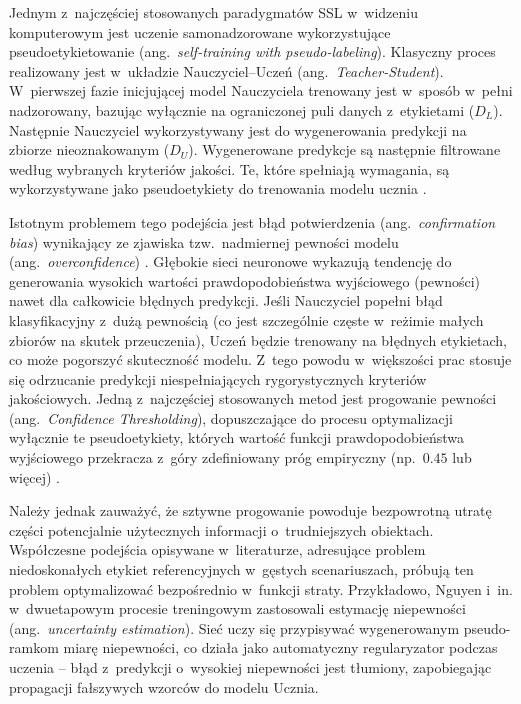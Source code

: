 Jednym z~najczęściej stosowanych paradygmatów SSL w~widzeniu komputerowym jest uczenie samonadzorowane wykorzystujące pseudoetykietowanie (ang.\ \emph{self-training with pseudo-labeling}). Klasyczny proces realizowany jest w~układzie Nauczyciel--Uczeń (ang.\ \emph{Teacher-Student}). W~pierwszej fazie inicjującej model Nauczyciela trenowany jest w~sposób w~pełni nadzorowany, bazując wyłącznie na ograniczonej puli danych z~etykietami ($D_L$). Następnie Nauczyciel wykorzystywany jest do wygenerowania predykcji na zbiorze nieoznakowanym ($D_U$). Wygenerowane predykcje są następnie filtrowane według wybranych kryteriów jakości. Te, które spełniają wymagania, są wykorzystywane jako pseudoetykiety do trenowania modelu ucznia \cite{Lee2013}.

Istotnym problemem tego podejścia jest błąd potwierdzenia (ang.\ \emph{confirmation bias}) wynikający ze zjawiska tzw.\ nadmiernej pewności modelu (ang.\ \emph{overconfidence}) \cite{Guo2017}. Głębokie sieci neuronowe wykazują tendencję do generowania wysokich wartości prawdopodobieństwa wyjściowego (pewności) nawet dla całkowicie błędnych predykcji. Jeśli Nauczyciel popełni błąd klasyfikacyjny z~dużą pewnością (co jest szczególnie częste w~reżimie małych zbiorów na skutek przeuczenia), Uczeń będzie trenowany na błędnych etykietach, co może pogorszyć skuteczność modelu. Z~tego powodu w~większości prac stosuje się odrzucanie predykcji niespełniających rygorystycznych kryteriów jakościowych. Jedną z~najczęściej stosowanych metod jest progowanie pewności (ang.\ \emph{Confidence Thresholding}), dopuszczające do procesu optymalizacji wyłącznie te pseudoetykiety, których wartość funkcji prawdopodobieństwa wyjściowego przekracza z~góry zdefiniowany próg empiryczny (np.\ $0.45$ lub więcej) \cite{Sohn2020}. 

Należy jednak zauważyć, że sztywne progowanie powoduje bezpowrotną utratę części potencjalnie użytecznych informacji o~trudniejszych obiektach. Współczesne podejścia opisywane w~literaturze, adresujące problem niedoskonałych etykiet referencyjnych w~gęstych scenariuszach, próbują ten problem optymalizować bezpośrednio w~funkcji straty. Przykładowo, Nguyen i~in. \cite{Nguyen2022} w~dwuetapowym procesie treningowym zastosowali estymację niepewności (ang.\ \emph{uncertainty estimation}). Sieć uczy się przypisywać wygenerowanym pseudo-ramkom miarę niepewności, co działa jako automatyczny regularyzator podczas uczenia -- błąd z~predykcji o~wysokiej niepewności jest tłumiony, zapobiegając propagacji fałszywych wzorców do modelu Ucznia.

